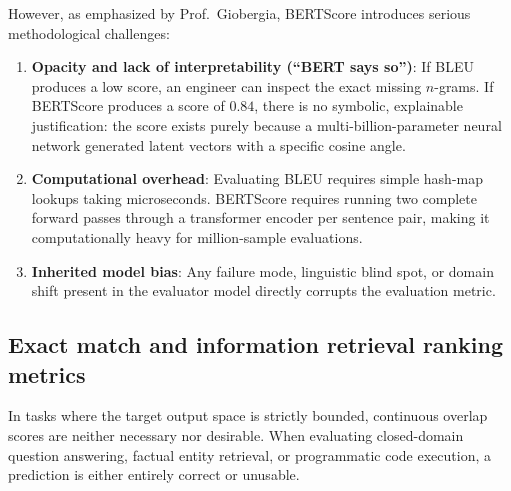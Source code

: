 \documentclass[../../../main.tex]{subfiles}
\begin{document}
However, as emphasized by Prof.~Giobergia, BERTScore introduces serious methodological challenges:
\begin{enumerate}
    \item \textbf{Opacity and lack of interpretability (``BERT says so'')}: If BLEU produces a low score, an engineer can inspect the exact missing $n$-grams. If BERTScore produces a score of $0.84$, there is no symbolic, explainable justification: the score exists purely because a multi-billion-parameter neural network generated latent vectors with a specific cosine angle.
    \item \textbf{Computational overhead}: Evaluating BLEU requires simple hash-map lookups taking microseconds. BERTScore requires running two complete forward passes through a transformer encoder per sentence pair, making it computationally heavy for million-sample evaluations.
    \item \textbf{Inherited model bias}: Any failure mode, linguistic blind spot, or domain shift present in the evaluator model directly corrupts the evaluation metric.
\end{enumerate}

\subsection{Exact match and information retrieval ranking metrics}
\label{subsec:exact_match_ranking}

In tasks where the target output space is strictly bounded, continuous overlap scores are neither necessary nor desirable. When evaluating closed-domain question answering, factual entity retrieval, or programmatic code execution, a prediction is either entirely correct or unusable.
\end{document}
